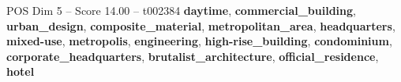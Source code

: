 \begin{textsample}{POS Dim 5 – Score 14.00 – t002384}  \label{ex:f5_pos_037}
\textbf{daytime}, \textbf{commercial\_building}, \textbf{urban\_design}, \textbf{composite\_material}, \textbf{metropolitan\_area}, \textbf{headquarters}, \textbf{mixed-use}, \textbf{metropolis}, \textbf{engineering}, \textbf{high-rise\_building}, \textbf{condominium}, \textbf{corporate\_headquarters}, \textbf{brutalist\_architecture}, \textbf{official\_residence}, \textbf{hotel}

\end{textsample}
